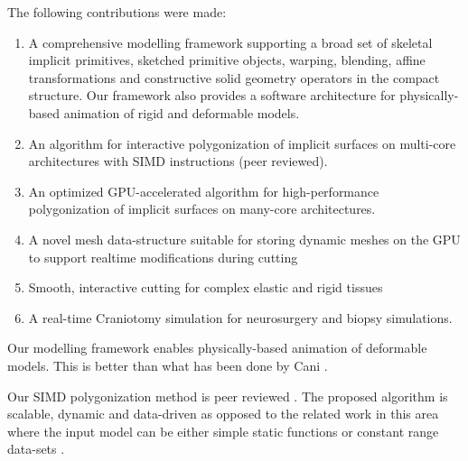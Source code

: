 \label{chapter:conclusion}
The following contributions were made:


\begin{enumerate}
  
\item A comprehensive modelling framework supporting a broad set of skeletal implicit primitives, 
 sketched primitive objects, warping, blending, affine transformations and constructive solid geometry 
 operators in the compact \blob structure. Our framework also provides a software architecture for 
 physically-based animation of rigid and deformable models.
 
 \item An algorithm for interactive polygonization of implicit surfaces on multi-core architectures with 
 SIMD instructions (peer reviewed). 
 
 \item An optimized GPU-accelerated algorithm for high-performance polygonization of implicit surfaces 
 on many-core architectures. 
 
 \item A novel mesh data-structure suitable for storing dynamic meshes on the GPU to support realtime 
 modifications during cutting
 
 \item Smooth, interactive cutting for complex elastic and rigid tissues 
 
 
\item A real-time Craniotomy simulation for neurosurgery and biopsy simulations.

\end{enumerate} 

Our modelling framework enables physically-based animation of deformable models. 
This is better than what has been done by Cani \etal \cite{Grascuel1997}.  

Our SIMD polygonization method is peer reviewed \cite{Shirazian2012}. 
The proposed algorithm is scalable, dynamic and data-driven as opposed to the related work in this 
area where the input model can be either simple static functions or constant range data-sets 
\cite{Johansson2006, Tatarchuk2007, Knoll2007, Yang2010}.

